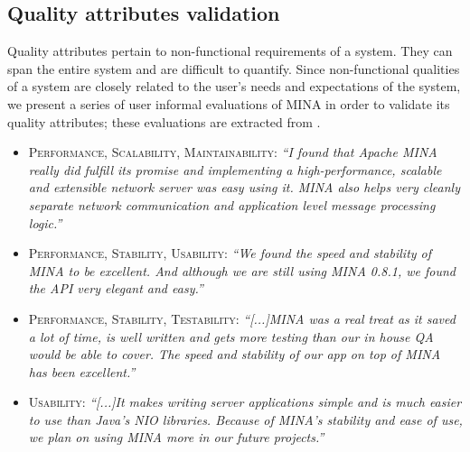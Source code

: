
\subsection{Quality attributes validation}
Quality attributes pertain to non-functional requirements of a system. They can span the entire system and are difficult to quantify. Since non-functional qualities of a system are closely related to the user's needs and expectations of the system, we present a series of user informal evaluations of MINA in order to validate its quality attributes; these evaluations are extracted from \cite{mina-testimonials}.

\begin{itemize}
    \item \textsc{Performance, Scalability, Maintainability}: \textit{``I found that Apache MINA really did fulfill its promise and implementing a high-performance, scalable and extensible network server was easy using it. MINA also helps very cleanly separate network communication and application level message processing logic.''} 
    \item \textsc{Performance, Stability, Usability}: \textit{``We found the speed and stability of MINA to be excellent. And although we are still using MINA 0.8.1, we found the API very elegant and easy.''}
    \item \textsc{Performance, Stability, Testability}: \textit{``[...]MINA was a real treat as it saved a lot of time, is well written and gets more testing than our in house QA would be able to cover. The speed and stability of our app on top of MINA has been excellent.''}
    \item \textsc{Usability}: \textit{``[...]It makes writing server applications simple and is much easier to use than Java’s NIO libraries. Because of MINA’s stability and ease of use, we plan on using MINA more in our future projects.''}
\end{itemize}